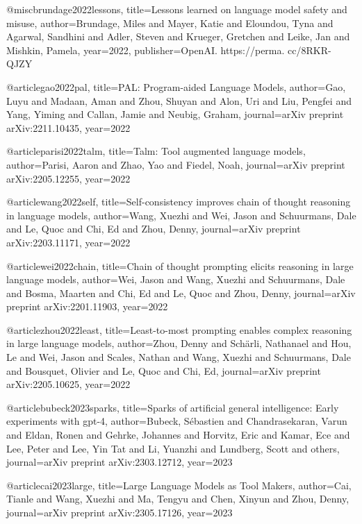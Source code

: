 
@misc{brundage2022lessons,
  title={Lessons learned on language model safety and misuse},
  author={Brundage, Miles and Mayer, Katie and Eloundou, Tyna and Agarwal, Sandhini and Adler, Steven and Krueger, Gretchen and Leike, Jan and Mishkin, Pamela},
  year={2022},
  publisher={OpenAI. https://perma. cc/8RKR-QJZY}
}

@article{gao2022pal,
  title={PAL: Program-aided Language Models},
  author={Gao, Luyu and Madaan, Aman and Zhou, Shuyan and Alon, Uri and Liu, Pengfei and Yang, Yiming and Callan, Jamie and Neubig, Graham},
  journal={arXiv preprint arXiv:2211.10435},
  year={2022}
}

@article{parisi2022talm,
  title={Talm: Tool augmented language models},
  author={Parisi, Aaron and Zhao, Yao and Fiedel, Noah},
  journal={arXiv preprint arXiv:2205.12255},
  year={2022}
}

@article{wang2022self,
  title={Self-consistency improves chain of thought reasoning in language models},
  author={Wang, Xuezhi and Wei, Jason and Schuurmans, Dale and Le, Quoc and Chi, Ed and Zhou, Denny},
  journal={arXiv preprint arXiv:2203.11171},
  year={2022}
}

@article{wei2022chain,
  title={Chain of thought prompting elicits reasoning in large language models},
  author={Wei, Jason and Wang, Xuezhi and Schuurmans, Dale and Bosma, Maarten and Chi, Ed and Le, Quoc and Zhou, Denny},
  journal={arXiv preprint arXiv:2201.11903},
  year={2022}
}

@article{zhou2022least,
  title={Least-to-most prompting enables complex reasoning in large language models},
  author={Zhou, Denny and Sch{\"a}rli, Nathanael and Hou, Le and Wei, Jason and Scales, Nathan and Wang, Xuezhi and Schuurmans, Dale and Bousquet, Olivier and Le, Quoc and Chi, Ed},
  journal={arXiv preprint arXiv:2205.10625},
  year={2022}
}


@article{bubeck2023sparks,
  title={Sparks of artificial general intelligence: Early experiments with gpt-4},
  author={Bubeck, S{\'e}bastien and Chandrasekaran, Varun and Eldan, Ronen and Gehrke, Johannes and Horvitz, Eric and Kamar, Ece and Lee, Peter and Lee, Yin Tat and Li, Yuanzhi and Lundberg, Scott and others},
  journal={arXiv preprint arXiv:2303.12712},
  year={2023}
}

@article{cai2023large,
  title={Large Language Models as Tool Makers},
  author={Cai, Tianle and Wang, Xuezhi and Ma, Tengyu and Chen, Xinyun and Zhou, Denny},
  journal={arXiv preprint arXiv:2305.17126},
  year={2023}
}

